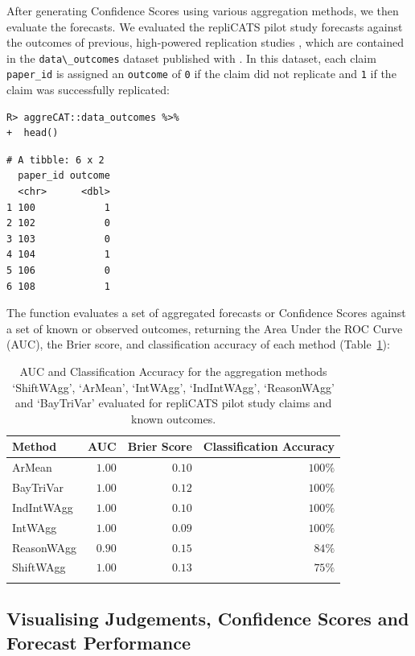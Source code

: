 \documentclass[article]{jss}
\newcommand{\fct}[1]{\code{#1()}}
\begin{document}
After generating Confidence Scores using various aggregation methods, we
then evaluate the forecasts. We evaluated the repliCATS pilot study
forecasts against the outcomes of previous, high-powered replication
studies \citep{Hanea2021}, which are contained in the
\texttt{data\textbackslash{}\_outcomes} dataset published with
. In this dataset, each claim \texttt{paper\_id} is
assigned an \texttt{outcome} of \texttt{0} if the claim did not
replicate and \texttt{1} if the claim was successfully replicated:

\begin{verbatim}
R> aggreCAT::data_outcomes %>% 
+  head()
\end{verbatim}

\begin{verbatim}
# A tibble: 6 x 2
  paper_id outcome
  <chr>      <dbl>
1 100            1
2 102            0
3 103            0
4 104            1
5 106            0
6 108            1
\end{verbatim}

The function \fct{confidence_score_evaluation} evaluates a set of
aggregated forecasts or Confidence Scores against a set of known or
observed outcomes, returning the Area Under the ROC Curve (AUC), the
Brier score, and classification accuracy of each method
(Table~\ref{tbl-multi-method-workflow-eval}):

\hypertarget{tbl-multi-method-workflow-eval}{}
\begin{longtable}{lrrr}

\toprule
Method & AUC & Brier Score & Classification Accuracy \\ 
\midrule
ArMean & $1.00$ & $0.10$ & $100\%$ \\ 
BayTriVar & $1.00$ & $0.12$ & $100\%$ \\ 
IndIntWAgg & $1.00$ & $0.10$ & $100\%$ \\ 
IntWAgg & $1.00$ & $0.09$ & $100\%$ \\ 
ReasonWAgg & $0.90$ & $0.15$ & $84\%$ \\ 
ShiftWAgg & $1.00$ & $0.13$ & $75\%$ \\ 
\bottomrule
\caption{\label{tbl-multi-method-workflow-eval}AUC and Classification Accuracy for the aggregation methods `ShiftWAgg',
`ArMean', `IntWAgg', `IndIntWAgg', `ReasonWAgg' and `BayTriVar'
evaluated for repliCATS pilot study claims and known outcomes. }\tabularnewline
\end{longtable}

\hypertarget{visualising-judgements-confidence-scores-and-forecast-performance}{%
\subsection{Visualising Judgements, Confidence Scores and Forecast
Performance}\label{visualising-judgements-confidence-scores-and-forecast-performance}}
\end{document}

